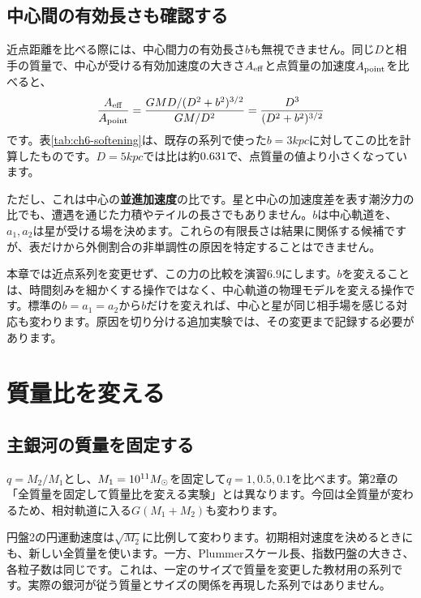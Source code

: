 \subsection{中心間の有効長さも確認する}
近点距離を比べる際には、中心間力の有効長さ$b$も無視できません。同じ$D$と相手の質量で、中心が受ける有効加速度の大きさ$A_{\rm eff}$と点質量の加速度$A_{\rm point}$を比べると、
\begin{equation}
\frac{A_{\rm eff}}{A_{\rm point}}=\frac{GM D/(D^2+b^2)^{3/2}}{GM/D^2}=\frac{D^3}{(D^2+b^2)^{3/2}}
\label{eq:ch6-softening-ratio}
\end{equation}
です。表\ref{tab:ch6-softening}は、既存の系列で使った$b=3\unit{kpc}$に対してこの比を計算したものです。$D=5\unit{kpc}$では比は約$0.631$で、点質量の値より小さくなっています。
\begin{table}[htbp]\centering\small
\caption{同じ距離での中心間加速度の比較。軌道の追加計算ではなく、式\eqref{eq:ch6-softening-ratio}の評価です。$b=3\unit{kpc}$を固定しています。}\label{tab:ch6-softening}

\end{table}

ただし、これは中心の\textbf{並進加速度}の比です。星と中心の加速度差を表す潮汐力の比でも、遭遇を通じた力積やテイルの長さでもありません。$b$は中心軌道を、$a_1,a_2$は星が受ける場を決めます。これらの有限長さは結果に関係する候補ですが、表だけから外側割合の非単調性の原因を特定することはできません。

本章では近点系列を変更せず、この力の比較を演習6.9にします。$b$を変えることは、時間刻みを細かくする操作ではなく、中心軌道の物理モデルを変える操作です。標準の$b=a_1=a_2$から$b$だけを変えれば、中心と星が同じ相手場を感じる対応も変わります。原因を切り分ける追加実験では、その変更まで記録する必要があります。

\section{質量比を変える}
\label{sec:ch6-mass}
\subsection{主銀河の質量を固定する}
$q=M_2/M_1$とし、$M_1=10^{11}M_\odot$を固定して$q=1,0.5,0.1$を比べます。第2章の「全質量を固定して質量比を変える実験」とは異なります。今回は全質量が変わるため、相対軌道に入る$G(M_1+M_2)$も変わります。

円盤2の円運動速度は$\sqrt{M_2}$に比例して変わります。初期相対速度を決めるときにも、新しい全質量を使います。一方、Plummerスケール長、指数円盤の大きさ、各粒子数は同じです。これは、一定のサイズで質量を変更した教材用の系列です。実際の銀河が従う質量とサイズの関係を再現した系列ではありません。

